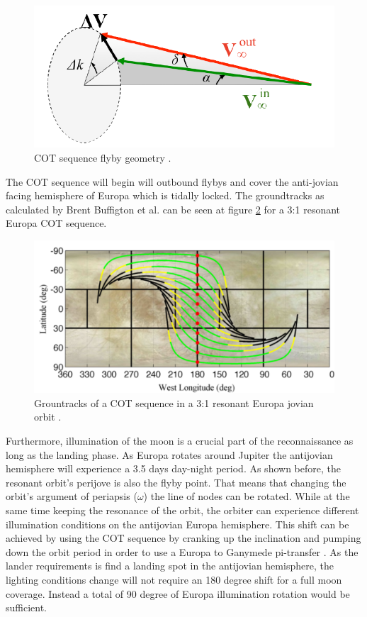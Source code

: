 \begin{figure}[htb!]
\centering
\includegraphics[scale=0.6]{figures/Orbiter/flbeom.png}
\caption{COT sequence flyby geometry \cite{cotseq}.}
\label{fig:cotgeo}
\end{figure}

The COT sequence will begin will outbound flybys and cover the anti-jovian facing hemisphere of Europa which is tidally locked. The groundtracks as calculated by Brent Buffigton et al. \cite{cotseq} can be seen at figure \ref{fig:ground_tr} for a 3:1 resonant Europa COT sequence.

\begin{figure}[htb!]
\centering
\includegraphics[width=\textwidth]{figures/Orbiter/groundtr.png}
\caption{Grountracks of a COT sequence in a 3:1 resonant Europa jovian orbit \cite{cotseq}.}
\label{fig:ground_tr}
\end{figure}

Furthermore, illumination of the moon is a crucial part of the reconnaissance as long as the landing phase. As Europa rotates around Jupiter the antijovian hemisphere will experience a 3.5 days day-night period. As shown before, the resonant orbit's perijove is also the flyby point. That means that changing the orbit's argument of periapsis ($\omega$) the line of nodes can be rotated. While at the same time keeping the resonance of the orbit, the orbiter can experience different illumination conditions on the antijovian Europa hemisphere. This shift can be achieved by using the COT sequence by cranking up the inclination and pumping down the orbit period in order to use a Europa to Ganymede pi-transfer \cite{cotseq}. As the lander requirements is find a landing spot in the antijovian hemisphere, the lighting conditions change will not require an 180 degree shift for a full moon coverage. Instead a total of 90 degree of Europa illumination rotation would be sufficient.  

